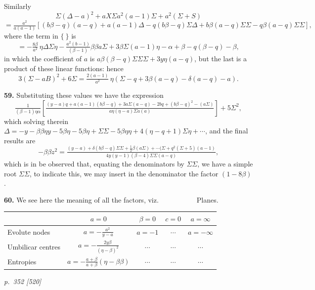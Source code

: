 \documentclass[11pt,a4paper]{article}
\theoremstyle{plain}
\theoremstyle{definition}
\begin{document}
Similarly
\[
\Sigma(\Delta - a)^2 + aX\Sigma a^2(a - 1)\Sigma + a^2(\Sigma + S)
\]
\[
= \tfrac{a^2}{a(a - 1)}\!\left[(b\beta - q)(a - q) + a(a - 1)\Delta - q(b\beta - q)\Sigma\Delta + b\beta(a - q)\Sigma\Sigma - q\beta(a - q)\Sigma\Sigma\right],
\]
where the term in $\{\ \}$ is
\[
= -\tfrac{8\beta}{a^2}\,\eta\Delta\Sigma\eta - \tfrac{a^2(b - 1)}{(\beta - 1)}\beta\beta a\Sigma + 3\beta\Sigma(a - 1)\eta - \alpha + \beta - q(\beta - q) - \beta,
\]
in which the coefficient of $a$ is $a\beta(\beta - q)\Sigma\Sigma\Sigma + 3y\eta(a - q)$, but the last is a product of these linear functions: hence
\[
3(\Sigma - aB)^2 + 6\Sigma = \tfrac{2(a - 1)}{a^2}\,\eta(\Sigma - q + 3\beta(a - q) - \delta(a - q) - a).
\]

\textbf{59.} Substituting these values we have the expression
\[
\tfrac{1}{(\beta - 1)\eta\alpha}\!\left[\tfrac{(y - a)q + a(a - 1)(b\beta - q) + 3a\Sigma(a - q) - 2bq + (b\beta - q)^2 - (a\Sigma)}{a\eta(\eta - a)\Sigma a(a)}\right] + 5\Sigma^2,
\]
which solving therein $\Delta = -y - \beta\beta\eta y - 5\beta\eta - 5\beta\eta + \Sigma\Sigma - 5\beta\eta\eta + 4(\eta - q + 1)\Sigma\eta + \cdots$, and the final results are
\[
-\beta\beta z^2 = \tfrac{(y - a)+ \delta(b\beta - q)\Sigma\Sigma + \tfrac{1}{2}\beta(a\Sigma) + \cdots(\Sigma + q^2(\Sigma + 5)(a - 1)}{4y(y - 1)(\beta - 4)\Sigma\Sigma(a - q)},
\]
which is in be observed that, equating the denominators by $\Sigma\Sigma$, we have a simple root $\Sigma\Sigma$, to indicate this, we may insert in the denominator the factor $(1 - 8\beta)$.

\textbf{60.} We see here the meaning of all the factors, viz.\ \ \ \ \ \ \ \ \ \ \ Planes.
\begin{center}
\begin{tabular}{l|cccc}
 & $a = 0$ & $\beta = 0$ & $c = 0$ & $a = \infty$\\
\hline
Evolute nodes & $a = -\tfrac{a^2}{y - a}$ & $a = -1$ & $\cdots$ & $a = -\infty$\\
Umbilicar centres & $a = -\tfrac{2y\beta}{(\eta - \beta)^2}$ & $\cdots$ & $\cdots$ & $\cdots$\\
Entropies & $a = -\tfrac{a + \beta}{a + \beta}(\eta - \beta\beta)$ & $\cdots$ & $\cdots$ & $\cdots$\\
\end{tabular}
\end{center}

\clearpage

\bigskip
\textit{p.~352 [520]}
\smallskip
\end{document}
